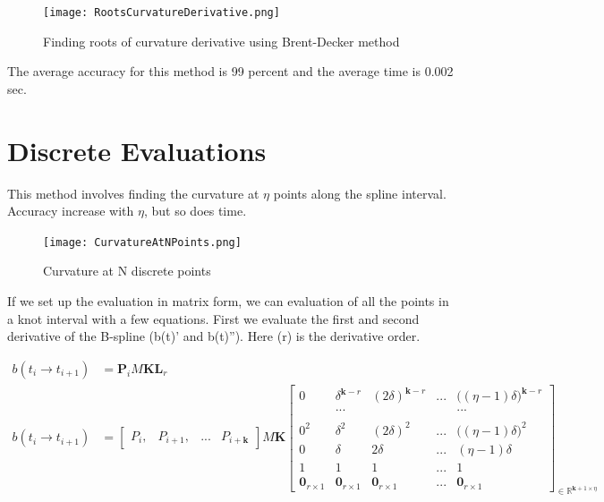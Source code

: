 \documentclass{article}
\begin{document}
\begin{figure}[H]
\centering
\texttt{[image: RootsCurvatureDerivative.png]}
\caption{Finding roots of curvature derivative using Brent-Decker method}
\label{RootsCurvatureDerivative}
\end{figure}

The average accuracy for this method is 99 percent and the average time is 0.002 sec.

\section{Discrete Evaluations}
This method involves finding the curvature at \(\eta\) points along the spline interval. Accuracy increase with \(\eta\), but so does time. 

\begin{figure}[H]
\begin{center}
\texttt{[image: CurvatureAtNPoints.png]}
\end{center}
\caption{Curvature at N discrete points}
\label{Fig:CurvatureAtNPoints}
\end{figure}

If we set up the evaluation in matrix form, we can evaluation of all the points in a knot interval with a few equations. First we evaluate the first and second derivative of the B-spline (b(t)' and b(t)''). Here (r) is the derivative order.



\begin{equation}
\begin{aligned}
    b(t_i \rightarrow t_{i+1}) &= \textbf{P}_i M \textbf{K}\textbf{L}_r\\
    b(t_i \rightarrow t_{i+1}) &= \begin{bmatrix} P_i, & P_{i+1}, & ... & P_{i+\textbf{k}} \end{bmatrix} M \textbf{K} \begin{bmatrix} 0 & \delta^{\textbf{k}-r} & (2\delta)^{\textbf{k}-r}& ... & \big((\eta-1) \delta\big)^{\textbf{k}-r}\\
    & ... & & & ... \\ \\
    0^2 &  \delta^2 & (2\delta)^2 & ... & \big((\eta-1) \delta\big)^2 \\ 
     0 &  \delta & 2\delta & ... & (\eta-1) \delta \\ 
     1 & 1 & 1 & ... & 1 \\
     \textbf{0}_{r \times 1} & \textbf{0}_{r \times 1} & \textbf{0}_{r \times 1} & ... & \textbf{0}_{r \times 1}\end{bmatrix}_{\in \mathbb{R}^{\textbf{k}+1 \times \eta}}
\end{aligned}
\end{equation}
\end{document}

